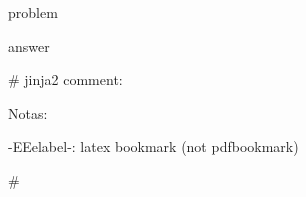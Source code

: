 
\clearpage


\begin{Exercise}[title={ {{ename}} }]
{{ problem }}
\end{Exercise}

\clearpage

\begin{Answer}
{{ answer }}
\end{Answer}

\clearpage



{# jinja2 comment: 

Notas:

-EE{{elabel}}-: latex bookmark (not pdfbookmark)



#}

